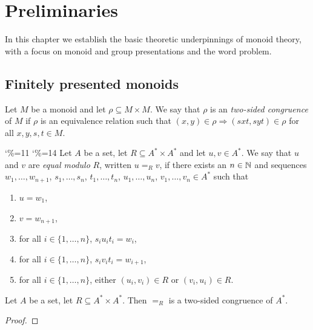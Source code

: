 \chapter{Preliminaries}\label{chap:preliminaries}

In this chapter we establish the basic theoretic underpinnings of monoid theory, with a focus on monoid and group
presentations and the word problem.

\section{Finitely presented monoids}

\begin{definition}\label{def:two_sided_cong}
	\rocqok{}
	Let $M$ be a monoid and let $\rho \subseteq M\times M$. We say that $\rho$ is an \emph{two-sided congruence} of $M$
	if $\rho$ is an equivalence relation such that $(x, y)\in \rho \Rightarrow (sxt, syt)\in \rho$ for all
	$x, y, s, t\in M$.
\end{definition}

\begin{definition}\label{def:equal_mod_R}
	\catcode`\%=11\relax
	\catcode`\%=14\relax
	\rocqok{}
	Let $A$ be a set, let $R\subseteq A^\ast \times A^\ast$ and let $u, v\in A^\ast$. We say that $u$ and $v$ are
	\emph{equal modulo} $R$, written $u =_R v$, if there exists an $n\in \mathbb{N}$ and sequences $w_1, \ldots, w_{n+1}$,
	$s_1, \ldots, s_n$, $t_1, \ldots, t_n$, $u_1, \ldots, u_n$, $v_1, \ldots, v_n\in A^\ast$ such that
	\begin{enumerate}
		\item $u = w_1$,
		\item $v = w_{n+1}$,
		\item for all $i\in \{1, \ldots, n\}$, $s_i u_i t_i = w_i$,
		\item for all $i\in \{1, \ldots, n\}$, $s_i v_i t_i = w_{i+1}$,
		\item for all $i\in \{1, \ldots, n\}$, either $(u_i, v_i) \in R$ or $(v_i, u_i) \in R$.
	\end{enumerate}
\end{definition}

\begin{lemma}\label{lem:equal_mod_R_cong}
	\rocqok{}
	Let $A$ be a set, let $R\subseteq A^\ast \times A^\ast$. Then $=_R$ is a two-sided congruence of $A^\ast$.
\end{lemma}
\begin{proof}
	\rocqok{}
\end{proof}

